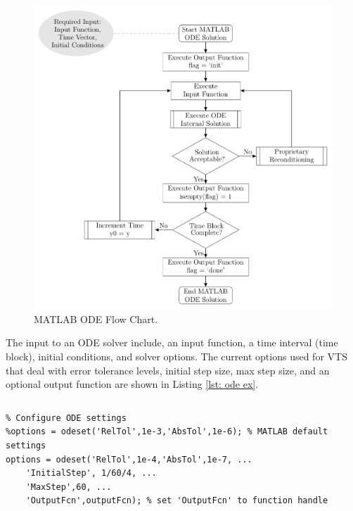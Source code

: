 \begin{figure}[!h]
	\centering
	\footnotesize
	\includegraphics[width=.9\linewidth]{./../../one-offs/200804-ODEblockDiagram/200804-ODEblockDiagram}
	\caption{MATLAB ODE Flow Chart.}
	\label{fig: MATLAB ode block diagram}
\end{figure}%

\pagebreak
The input to an ODE solver include, an input function, a time interval (time block), initial conditions, and solver options.
The current options used for VTS  that deal with error tolerance levels, initial step size, max step size, and an optional output function are shown in Listing \ref{lst: ode ex}.

\begin{lstlisting}[caption={MATLAB ODE Solver Option Example},label={lst: ode ex}]
\end{lstlisting}\vspace{-2 em}
\begin{verbatim}
% Configure ODE settings
%options = odeset('RelTol',1e-3,'AbsTol',1e-6); % MATLAB default settings
options = odeset('RelTol',1e-4,'AbsTol',1e-7, ...
    'InitialStep', 1/60/4, ...
    'MaxStep',60, ...
    'OutputFcn',outputFcn); % set 'OutputFcn' to function handle
\end{verbatim}


